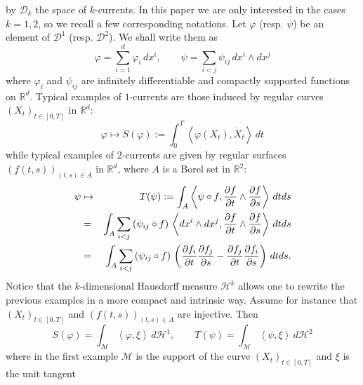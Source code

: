 \documentclass{article}
\begin{document}
by $\mathcal{D}_{k}$ the space of $k$-currents. In this paper we are only
interested in the cases $k=1,2$, so we recall a few corresponding notations.
Let $\varphi $ (resp. $\psi $) be an element of $\mathcal{D}^{1}$ (resp. $%
\mathcal{D}^{2}$). We shall write them as 
\begin{equation*}
\varphi =\sum_{i=1}^{d}\varphi _{i}\,dx^{i},\qquad \psi =\sum_{i<j}\psi
_{ij}\,dx^{i}\wedge dx^{j}
\end{equation*}
where $\varphi _{i}$ and $\psi _{ij}$ are infinitely differentiable and
compactly supported functions on $\mathbb{R}^{d}$.
Typical examples of $1$-currents are those induced by regular curves $\left(
X_{t}\right) _{t\in \left[ 0,T\right] }$ in $\mathbb{R}^{d}$: 
\begin{equation*}
\varphi \mapsto S(\varphi ):=\int_{0}^{T}\left\langle \varphi \left(
X_{t}\right) ,\dot{X}_{t}\right\rangle \,dt
\end{equation*}
while typical examples of $2$-currents are given by regular surfaces $\left(
f\left( t,s\right) \right) _{(t,s)\in A}$ in $\mathbb{R}^{d}$, where $A$ is
a Borel set in $\mathbb{R}^{2}$: 
\begin{eqnarray*}
\psi &\mapsto &T(\psi ):=\int_{A}\left\langle \psi \circ f,\frac{\partial f}{%
\partial t}\wedge \frac{\partial f}{\partial s}\right\rangle \,dtds \\
&=&\int_{A}\sum_{i<j}\left( \psi _{ij}\circ f\right) \,\left\langle
dx^{i}\wedge dx^{j},\frac{\partial f}{\partial t}\wedge \frac{\partial f}{%
\partial s}\right\rangle \,dtds \\
&=&\int_{A}\sum_{i<j}\left( \psi _{ij}\circ f\right) \,\left( \frac{\partial
f_{i}}{\partial t}\frac{\partial f_{j}}{\partial s}-\frac{\partial f_{j}}{%
\partial t}\frac{\partial f_{i}}{\partial s}\right) \,dtds.
\end{eqnarray*}
Notice that the $k$-dimensional Hausdorff measure $\mathcal{H}^{k}$ allows
one to rewrite the previous examples in a more compact and intrinsic way.
Assume for instance that $\left( X_{t}\right) _{t\in \left[ 0,T\right] }$
and $\left( f\left( t,s\right) \right) _{(t,s)\in A}$ are injective. Then 
\begin{equation*}
S(\varphi )=\int_{\mathcal{M}}\left\langle \varphi ,\xi \right\rangle \,d%
\mathcal{H}^{1},\qquad T(\psi )=\int_{\mathcal{M}}\left\langle \psi ,\xi
\right\rangle \,d\mathcal{H}^{2}
\end{equation*}
where in the first example $\mathcal{M}$ is the support of the curve $\left(
X_{t}\right) _{t\in \left[ 0,T\right] }$ and $\xi $ is the unit tangent
\end{document}

